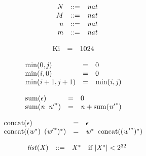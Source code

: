 \vspace{1ex}

$$
\begin{array}{@{}lrrl@{}l@{}}
& {\mathit{N}} &::=& {\mathit{nat}} \\
& {\mathit{M}} &::=& {\mathit{nat}} \\
& {\mathit{n}} &::=& {\mathit{nat}} \\
& {\mathit{m}} &::=& {\mathit{nat}} \\
\end{array}
$$

\vspace{1ex}

$$
\begin{array}{@{}lcl@{}l@{}}
{\mathrm{Ki}} &=& 1024 &  \\
\end{array}
$$

\vspace{1ex}

$$
\begin{array}{@{}lcl@{}l@{}}
{\mathrm{min}}(0, {\mathit{j}}) &=& 0 &  \\
{\mathrm{min}}({\mathit{i}}, 0) &=& 0 &  \\
{\mathrm{min}}({\mathit{i}} + 1, {\mathit{j}} + 1) &=& {\mathrm{min}}({\mathit{i}}, {\mathit{j}}) &  \\
\end{array}
$$

$$
\begin{array}{@{}lcl@{}l@{}}
{\mathrm{sum}}(\epsilon) &=& 0 &  \\
{\mathrm{sum}}({\mathit{n}}~\,{{\mathit{n}'}^\ast}) &=& {\mathit{n}} + {\mathrm{sum}}({{\mathit{n}'}^\ast}) &  \\
\end{array}
$$

\vspace{1ex}

$$
\begin{array}{@{}lcl@{}l@{}}
{\mathrm{concat}}(\epsilon) &=& \epsilon &  \\
{\mathrm{concat}}(({{\mathit{w}}^\ast})~\,{({{\mathit{w}'}^\ast})^\ast}) &=& {{\mathit{w}}^\ast}~\,{\mathrm{concat}}({({{\mathit{w}'}^\ast})^\ast}) &  \\
\end{array}
$$

$$
\begin{array}{@{}lrrl@{}l@{}}
& {\mathit{list}}({\mathit{X}}) &::=& {{\mathit{X}}^\ast} &\quad
  \mbox{if}~{|{{\mathit{X}}^\ast}|} < {2^{32}} \\
\end{array}
$$

